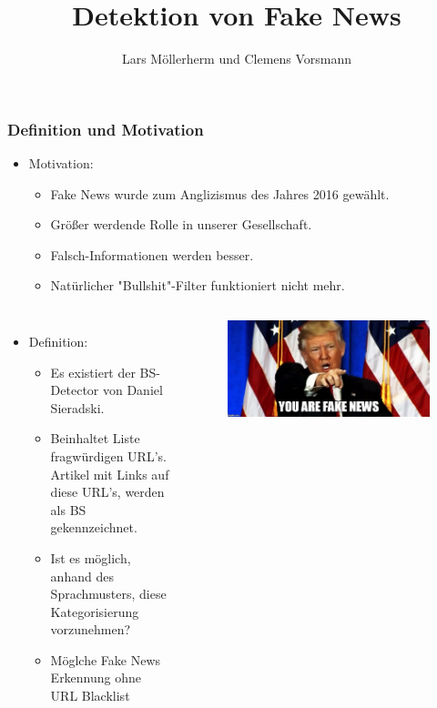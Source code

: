 \documentclass[aspectratio=1610, professionalfonts, 9pt]{beamer}
\title{Detektion von Fake News}
\author{Lars Möllerherm und Clemens Vorsmann}
\institute{Fakultät Physik}
\begin{document}
  \begin{frame}
    \titlepage
  \end{frame}

  \begin{frame}
    \frametitle{Definition und Motivation}
    \begin{itemize}
      \item Motivation:
      \begin{itemize}
        \item Fake News wurde zum Anglizismus des Jahres 2016 gewählt\cite{angli}.
        \item Größer werdende Rolle in unserer Gesellschaft.
        \item Falsch-Informationen werden besser.
        \item Natürlicher "Bullshit"-Filter funktioniert nicht mehr.
      \end{itemize}
    \end{itemize}
    \begin{columns}
      \begin{itemize}
        \item Definition:
        \begin{itemize}
        \item Es existiert der BS-Detector von Daniel Sieradski\cite{BS}.
        \item Beinhaltet Liste fragwürdigen URL's. Artikel mit Links auf diese URL's, 
            werden als BS gekennzeichnet.
        \item Ist es möglich, anhand des Sprachmusters, diese Kategorisierung vorzunehmen?
        \item Möglche Fake News Erkennung ohne URL Blacklist
        \end{itemize}
      \end{itemize}
      \begin{figure}
          \includegraphics[width=\textwidth]{pictures/trump-fake-news.jpg}
          \caption{\cite{trump}}
          \label{}
        \end{figure}
      \end{columns}
  \end{frame}
\end{document}
